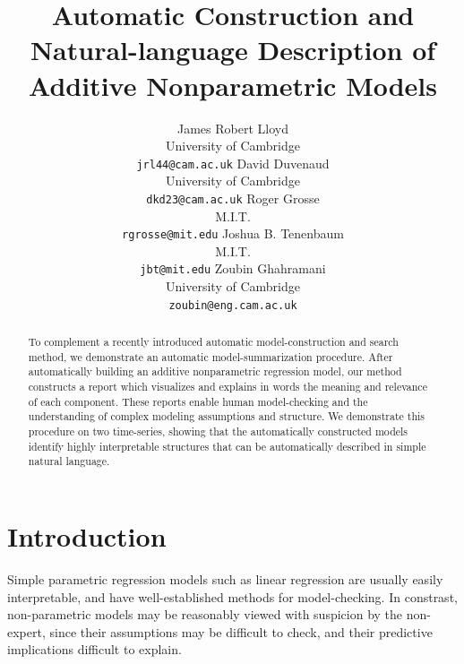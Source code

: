 \documentclass{article} %
\title{Automatic Construction and Natural-language Description of Additive Nonparametric Models}
\author{
James Robert Lloyd\\
University of Cambridge\\
\texttt{jrl44@cam.ac.uk}
\And
David Duvenaud\\
University of Cambridge \\
\texttt{dkd23@cam.ac.uk}
\And
Roger Grosse\\
M.I.T.\\
\texttt{rgrosse@mit.edu}
\And
Joshua B. Tenenbaum\\
M.I.T.\\
\texttt{jbt@mit.edu}
\And
Zoubin Ghahramani\\
University of Cambridge \\
\texttt{zoubin@eng.cam.ac.uk}
}
\begin{document}
\allowdisplaybreaks

\maketitle

\begin{abstract}
To complement a recently introduced automatic model-construction and search method, we demonstrate an automatic model-summarization procedure.
After automatically building an additive nonparametric regression model, our method constructs a report which visualizes and explains in words the meaning and relevance of each component.
These reports enable human model-checking and the understanding of complex modeling assumptions and structure.
We demonstrate this procedure on two time-series, showing that the automatically constructed models identify highly interpretable structures that can be automatically described in simple natural language.
\end{abstract}

\section{Introduction}
\vspace{-0.1in}


Simple parametric regression models such as linear regression are usually easily interpretable, and have well-established methods for model-checking.
In constrast, non-parametric models may be reasonably viewed with suspicion by the non-expert, since their assumptions may be difficult to check, and their predictive implications difficult to explain.

\end{document}

